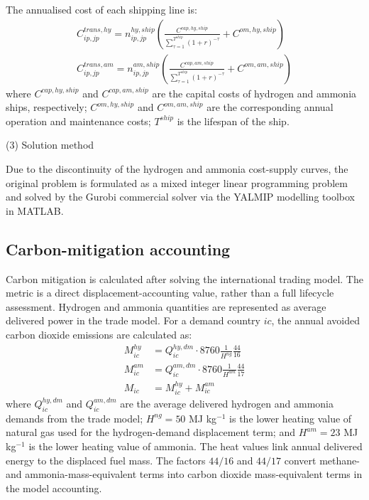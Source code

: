 \documentclass[sn-mathphys,Numbered]{sn-jnl}%
\theoremstyle{plain}%
\theoremstyle{definition}%
\theoremstyle{remark}%
\begin{document}
The annualised cost of each shipping line is:
\begin{align}
    C_{ip,jp}^{trans,hy} =  n_{ip,jp}^{hy,ship} \left( \frac{C^{cap,hy,ship}}{\sum_{\tau = 1}^{T^{ship}} (1+r)^{-\tau}} + C^{om,hy,ship} \right)
    \\
    C_{ip,jp}^{trans,am} =  n_{ip,jp}^{am,ship} \left( \frac{C^{cap,am,ship}}{\sum_{\tau = 1}^{T^{ship}} (1+r)^{-\tau}} + C^{om,am,ship} \right)
\end{align}
where $C^{cap,hy,ship}$ and $C^{cap,am,ship}$ are the capital costs of hydrogen and ammonia ships, respectively; $C^{om,hy,ship}$ and $C^{om,am,ship}$ are the corresponding annual operation and maintenance costs; $T^{ship}$ is the lifespan of the ship.

(3) Solution method

Due to the discontinuity of the hydrogen and ammonia cost-supply curves, the original problem is formulated as a mixed integer linear programming problem and solved by the Gurobi \cite{Gurobi} commercial solver via the YALMIP modelling toolbox in MATLAB.

\subsection{Carbon-mitigation accounting}

Carbon mitigation is calculated after solving the international trading model. The metric is a direct displacement-accounting value, rather than a full lifecycle assessment. Hydrogen and ammonia quantities are represented as average delivered power in the trade model. For a demand country $ic$, the annual avoided carbon dioxide emissions are calculated as:
\begin{align}
    M_{ic}^{hy} &=
    Q_{ic}^{hy,dm}
    \cdot 8760
    \frac{1}{H^{ng}}
    \frac{44}{16}
    \\
    M_{ic}^{am} &=
    Q_{ic}^{am,dm}
    \cdot 8760
    \frac{1}{H^{am}}
    \frac{44}{17}
    \\
    M_{ic} &= M_{ic}^{hy} + M_{ic}^{am}
\end{align}
where $Q_{ic}^{hy,dm}$ and $Q_{ic}^{am,dm}$ are the average delivered hydrogen and ammonia demands from the trade model; $H^{ng}=50$ MJ kg$^{-1}$ is the lower heating value of natural gas used for the hydrogen-demand displacement term; and $H^{am}=23$ MJ kg$^{-1}$ is the lower heating value of ammonia. The heat values link annual delivered energy to the displaced fuel mass. The factors $44/16$ and $44/17$ convert methane- and ammonia-mass-equivalent terms into carbon dioxide mass-equivalent terms in the model accounting.
\end{document}
